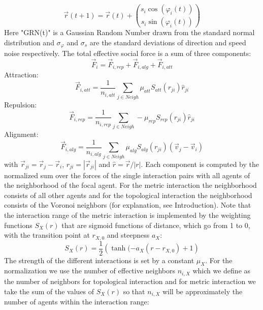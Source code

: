 	\begin{equation}
		\vec{r}(t+1) = \vec{r}(t) + {s_i\cos(\varphi_i(t)) \choose s_i\sin(\varphi_i(t)) }
		\label{eq:r_update}
	\end{equation}
	Here "GRN(t)" is a Gaussian Random Number drawn from the standard normal distribution and $\sigma_\varphi$ and $\sigma_s$ are the standard deviations of direction and speed noise respectively.
	The total effective social force is a sum of three components:
	\begin{equation}
		\vec{F}_i=\vec{F}_{i,rep}+\vec{F}_{i,alg}+\vec{F}_{i,att}
		\label{eq:forces}
	\end{equation}
	Attraction:
	\begin{equation}
		\vec{F}_{i,att}= \frac{1}{n_{i,att}}\sum_{j \in Neigh} \mu_{att}S_{att}({r}_{ji}) \hat{r}_{ji}
		\label{eq:att}
	\end{equation}
	Repulsion:
	\begin{equation}
		\vec{F}_{i,rep}=\frac{1}{n_{i,rep}}\sum_{j \in Neigh} -\mu_{rep}S_{rep}({r}_{ji}) \hat{r}_{ji}
		\label{eq:rep}
	\end{equation}
	Alignment:
	\begin{equation}
		\vec{F}_{i,alg}=\frac{1}{n_{i,alg}}\sum_{j \in Neigh} \mu_{alg}S_{alg}({r}_{ji}) (\vec{v}_j-\vec{v}_i)
		\label{eq:alg}
	\end{equation}
	with $\vec{r}_{ji} = \vec{r}_j - \vec{r}_i$, $r_{ji} = |\vec{r}_{ji}|$ and $\hat r = \vec{r}/|r|$.
	Each component is computed by the normalized sum over the forces of the single interaction pairs with all agents of the neighborhood of the focal agent.
	For the metric interaction the neighborhood consists of all other agents and for the topological interaction the neighborhood consists of the Voronoi neighbors (for explanation, see Introduction).
	Note that the interaction range of the metric interaction is implemented by the weighting functions $S_X(r)$ that are sigmoid functions of distance, which go from 1 to 0, with the transition point at $r_{X,0}$ and steepness $a_{X}$:
	\begin{equation}
	S_X(r)=\frac{1}{2}\left(\tanh(-a_{X}(r-r_{X,0})+1\right)
	\label{eq:sigm}
	\end{equation}
	The strength of the different interactions is set by a constant $\mu_X$.
	For the normalization we use the number of effective neighbors $n_{i,X}$ which we define as the number of neighbors for topological interaction and for metric interaction we take the sum of the values of $S_X(r)$ so that $n_{i,X}$ will be approximately the number of agents within the interaction range:
